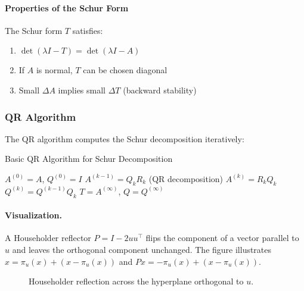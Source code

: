 \paragraph{Properties of the Schur Form}
The Schur form $T$ satisfies:
\begin{enumerate}
    \item $\det(\lambda I - T) = \det(\lambda I - A)$
    \item If $A$ is normal, $T$ can be chosen diagonal
    \item Small $\Delta A$ implies small $\Delta T$ (backward stability)
\end{enumerate}

\subsubsection{QR Algorithm}

The QR algorithm computes the Schur decomposition iteratively:
\begin{algorithm}[ht]
    \caption{Basic QR Algorithm for Schur Decomposition}
    \label{alg:qr-schur}
    \begin{algorithmic}[1]
        \Require $A^{(0)} = A$, $Q^{(0)} = I$
        \State $A^{(k-1)} = Q_k R_k$ (QR decomposition)
        \State $A^{(k)} = R_k Q_k$
        \State $Q^{(k)} = Q^{(k-1)} Q_k$
        \EndFor
        \Ensure $T = A^{(\infty)}$, $Q = Q^{(\infty)}$
    \end{algorithmic}
\end{algorithm}

\paragraph{Visualization.} A Householder reflector $P=I-2uu^\top$ flips the component of a vector parallel to $u$ and leaves the orthogonal component unchanged. The figure illustrates $x=\pi_u(x)+(x-\pi_u(x))$ and $Px=-\pi_u(x)+(x-\pi_u(x))$.
\begin{figure}[H]
    \centering
    
    \caption{Householder reflection across the hyperplane orthogonal to $u$.}
\end{figure}


